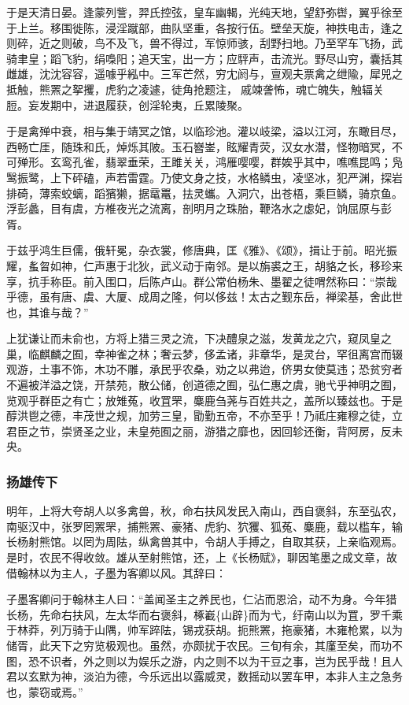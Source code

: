 \documentclass[]{article}
\begin{document}
于是天清日晏。逢蒙列訾，羿氏控弦，皇车幽輵，光纯天地，望舒弥辔，翼乎徐至于上兰。移围徙陈，浸淫蹴部，曲队坚重，各按行伍。壁垒天旋，神抶电击，逢之则碎，近之则破，鸟不及飞，兽不得过，军惊师骇，刮野扫地。乃至罕车飞扬，武骑聿皇；蹈飞豹，绢嘄阳；追天宝，出一方；应駍声，击流光。野尽山穷，囊括其雌雄，沈沈容容，遥噱乎紭中。三军芒然，穷冘阏与，亶观夫票禽之绁隃，犀兕之抵触，熊罴之挐攫，虎豹之凌遽，徒角抢题注，戚竦詟怖，魂亡魄失，触辐关脰。妄发期中，进退履获，创淫轮夷，丘累陵聚。

于是禽殚中衰，相与集于靖冥之馆，以临珍池。灌以岐梁，溢以江河，东瞰目尽，西畅亡厓，随珠和氏，焯烁其陂。玉石嶜崟，眩耀青荧，汉女水潜，怪物暗冥，不可殚形。玄鸾孔雀，翡翠垂荣，王雎关关，鸿雁嘤嘤，群娭乎其中，噍噍昆鸣；凫鹥振鹭，上下砰磕，声若雷霆。乃使文身之技，水格鳞虫，凌坚冰，犯严渊，探岩排碕，薄索蛟螭，蹈獱獭，据鼋鼍，抾灵蠵。入洞穴，出苍梧，乘巨鳞，骑京鱼。浮彭蠡，目有虞，方椎夜光之流离，剖明月之珠胎，鞭洛水之虙妃，饷屈原与彭胥。

于兹乎鸿生巨儒，俄轩冕，杂衣裳，修唐典，匡《雅》、《颂》，揖让于前。昭光振耀，蚃曶如神，仁声惠于北狄，武义动于南邻。是以旃裘之王，胡貉之长，移珍来享，抗手称臣。前入围口，后陈卢山。群公常伯杨朱、墨翟之徒喟然称曰：``崇哉乎德，虽有唐、虞、大厦、成周之隆，何以侈兹！太古之觐东岳，禅梁基，舍此世也，其谁与哉？''

上犹谦让而未俞也，方将上猎三灵之流，下决醴泉之滋，发黄龙之穴，窥凤皇之巢，临麒麟之囿，幸神雀之林；奢云梦，侈孟诸，非章华，是灵台，罕徂离宫而辍观游，土事不饰，木功不雕，承民乎农桑，劝之以弗迨，侪男女使莫违；恐贫穷者不遍被洋溢之饶，开禁苑，散公储，创道德之囿，弘仁惠之虞，驰弋乎神明之囿，览观乎群臣之有亡；放雉菟，收罝罘，麋鹿刍荛与百姓共之，盖所以臻兹也。于是醇洪鬯之德，丰茂世之规，加劳三皇，勖勤五帝，不亦至乎！乃祗庄雍穆之徒，立君臣之节，崇贤圣之业，未皇苑囿之丽，游猎之靡也，因回轸还衡，背阿房，反未央。

\hypertarget{header-n5896}{%
\subsubsection{扬雄传下}\label{header-n5896}}

明年，上将大夸胡人以多禽兽，秋，命右扶风发民入南山，西自褒斜，东至弘农，南驱汉中，张罗罔罴罘，捕熊罴、豪猪、虎豹、狖玃、狐菟、麋鹿，载以槛车，输长杨射熊馆。以罔为周阹，纵禽兽其中，令胡人手搏之，自取其获，上亲临观焉。是时，农民不得收敛。雄从至射熊馆，还，上《长杨赋》，聊因笔墨之成文章，故借翰林以为主人，子墨为客卿以风。其辞曰：

子墨客卿问于翰林主人曰：``盖闻圣主之养民也，仁沾而恩洽，动不为身。今年猎长杨，先命右扶风，左太华而右褒斜，椓嶻\{山辟\}而为弋，纡南山以为罝，罗千乘于林莽，列万骑于山隅，帅军踤阹，锡戎获胡。扼熊罴，拖豪猪，木雍枪累，以为储胥，此天下之穷览极观也。虽然，亦颇扰于农民。三旬有余，其廑至矣，而功不图，恐不识者，外之则以为娱乐之游，内之则不以为干豆之事，岂为民乎哉！且人君以玄默为神，淡泊为德，今乐远出以露威灵，数摇动以罢车甲，本非人主之急务也，蒙窃或焉。''
\end{document}
